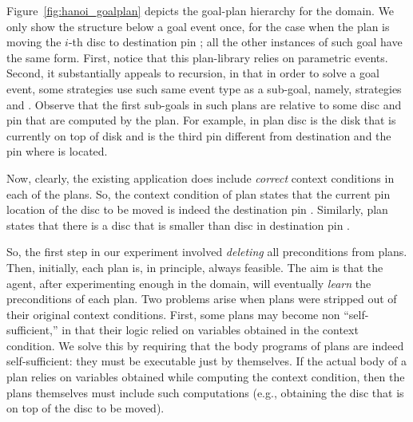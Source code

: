  
Figure~\ref{fig:hanoi_goalplan} depicts the goal-plan hierarchy for the domain.
We only show the structure below a  goal event once, for the
case when the plan  is moving the $i$-th disc to destination
pin ; all the other instances of such goal have the same form.
First, notice that this plan-library relies on parametric events. Second, it
substantially appeals to recursion, in that in order to solve a
 goal event, some strategies use such same event type as a
sub-goal, namely, strategies  and .
Observe that the first sub-goals in such plans are relative to some disc
 and pin  that are computed by the plan. For example,
in plan  disc  is the disk that is currently on
top of disk  and  is the third pin different from
destination  and the pin where  is located.


Now, clearly, the existing application does include \emph{correct}
context conditions in each of the plans. So, the context condition of plan
 states that the current pin location of the disc
 to be moved is indeed the destination pin . Similarly,
plan  states that there is a disc that is smaller than disc
 in destination pin .

So, the first step in our experiment involved \emph{deleting} all preconditions
from plans. Then, initially, each plan is, in principle, always feasible. The aim
is that the agent, after experimenting enough in the domain, will eventually
\emph{learn} the preconditions of each plan.
Two problems arise when plans were stripped out of their original context
conditions.
First, some plans may become non ``self-sufficient,'' in that their logic relied
on variables obtained in the context condition. We solve this by requiring that
the body programs of plans are indeed self-sufficient: they must be executable
just by themselves. If the actual body of a plan relies on variables obtained
while computing the context condition, then the plans themselves must include
such computations (e.g., obtaining the disc that is on top of the disc to be
moved).

